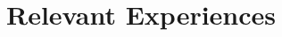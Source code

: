 \documentclass[11pt]{article}
\begin{document}
{\begin{tabularx}{\textwidth}{@{} p{} p{} @{}}
			\end{tabularx}

		}



\section{\textcolor{section_2}{Relevant Experiences}}
\vspace{-\baselineskip}
\end{document}
